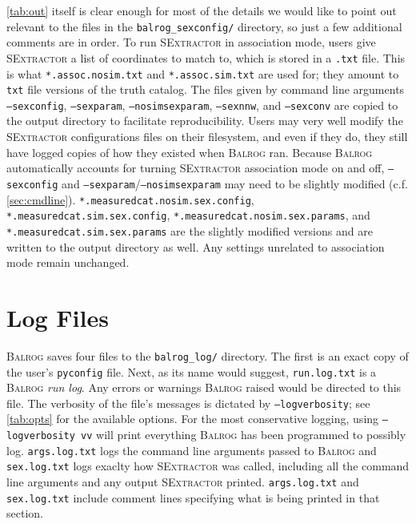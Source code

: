 \documentclass[11pt]{book}
\newcommand{\codett}[1]{\texttt{#1}}
\newcommand{\pyconfig}{\codett{pyconfig}}
\newcommand{\balrog}{\textsc{Balrog}}
\newcommand{\sex}{\textsc{SExtractor}}
\newcommand{\opt}[1]{\codett{--#1}}
\begin{document}
\autoref{tab:out} itself is clear enough for most of the details we would like to point out relevant to
the files in the \codett{balrog\_sexconfig/} directory, so just a few additional comments are in order.
To run \sex{} in association mode, users give \sex{} a list of coordinates to match to, which is stored in a \codett{.txt} file.
This is what \codett{*.assoc.nosim.txt} and \codett{*.assoc.sim.txt} are used for;
they amount to \codett{txt} file versions of the truth catalog.
The files given by command line arguments \opt{sexconfig}, \opt{sexparam}, \opt{nosimsexparam}, \opt{sexnnw}, and \opt{sexconv}
are copied to the output directory to facilitate reproducibility. Users may very well modify 
the \sex{} configurations files on their filesystem, and even if they do, they still have logged copies of how they existed when \balrog{} ran.
Because \balrog{} automatically accounts for turning \sex{} association mode on and off, 
\opt{sexconfig} and \opt{sexparam}/\opt{nosimsexparam} may need to be slightly modified
(c.f. \autoref{sec:cmdline}).
\codett{*.measuredcat.nosim.sex.config}, \codett{*.measuredcat.sim.sex.config}, \codett{*.measuredcat.nosim.sex.params}, 
and \codett{*.measuredcat.sim.sex.params} 
are the slightly modified versions and are written to the output directory as well.
Any settings unrelated to association mode remain unchanged.


\section{Log Files}
\label{sec:logs}

\balrog{} saves four files to the \codett{balrog\_log/} directory.
The first is an exact copy of the user's \pyconfig{} file.
Next, as its name would suggest, \codett{run.log.txt} is a \balrog{} \emph{run log}.
Any errors or warnings \balrog{} raised would be directed to this file.
The verbosity of the file's messages is dictated by \opt{logverbosity}; see \autoref{tab:opts}
for the available options. For the most conservative logging, 
using \opt{logverbosity vv} will print everything \balrog{} has been programmed 
to possibly log.
\codett{args.log.txt} logs the command line arguments passed to \balrog{}
and \codett{sex.log.txt} logs exaclty how \sex{} was called, including all the command line arguments and any output \sex{} printed.
\codett{args.log.txt} and \codett{sex.log.txt} include comment lines specifying 
what is being printed in that section.
\end{document}
